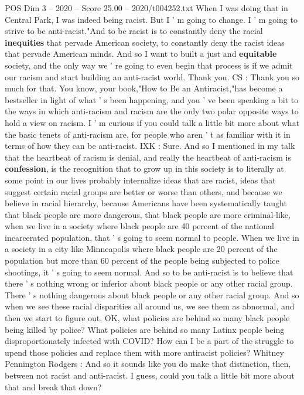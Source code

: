 \begin{textsample}{POS Dim 3 – 2020 – Score 25.00 – 2020/t004252.txt}
When I was doing that in Central Park, I was indeed being racist.
But I ' m going to change.
I ' m going to strive to be anti-racist."And to be racist is to constantly deny the racial \textbf{inequities} that pervade American society, to constantly deny the racist ideas that pervade American minds.
And so I want to built a just and \textbf{equitable} society, and the only way we ' re going to even begin that process is if we admit our racism and start building an anti-racist world.
Thank you.
CS : Thank you so much for that.
You know, your book,"How to Be an Antiracist,"has become a bestseller in light of what ' s been happening, and you ' ve been speaking a bit to the ways in which anti-racism and racism are the only two polar opposite ways to hold a view on racism.
I ' m curious if you could talk a little bit more about what the basic tenets of anti-racism are, for people who aren ' t as familiar with it in terms of how they can be anti-racist.
IXK : Sure.
And so I mentioned in my talk that the heartbeat of racism is denial, and really the heartbeat of anti-racism is \textbf{confession}, is the recognition that to grow up in this society is to literally at some point in our lives probably internalize ideas that are racist, ideas that suggest certain racial groups are better or worse than others, and because we believe in racial hierarchy, because Americans have been systematically taught that black people are more dangerous, that black people are more criminal-like, when we live in a society where black people are 40 percent of the national incarcerated population, that ' s going to seem normal to people.
When we live in a society in a city like Minneapolis where black people are 20 percent of the population but more than 60 percent of the people being subjected to police shootings, it ' s going to seem normal.
And so to be anti-racist is to believe that there ' s nothing wrong or inferior about black people or any other racial group.
There ' s nothing dangerous about black people or any other racial group.
And so when we see these racial disparities all around us, we see them as abnormal, and then we start to figure out, OK, what policies are behind so many black people being killed by police?
What policies are behind so many Latinx people being disproportionately infected with COVID?
How can I be a part of the struggle to upend those policies and replace them with more antiracist policies?
Whitney Pennington Rodgers : And so it sounds like you do make that distinction, then, between not racist and anti-racist.
I guess, could you talk a little bit more about that and break that down?

\end{textsample}
